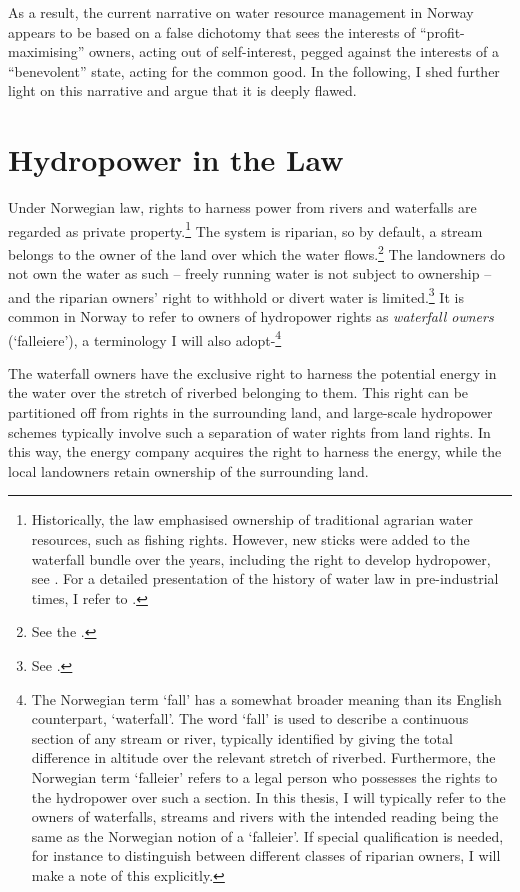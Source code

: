 As a result, the current narrative on water resource management in Norway appears to be based on a false dichotomy that sees the interests of ``profit-maximising'' owners, acting out of self-interest, pegged against the interests of a ``benevolent'' state, acting for the common good. In the following, I shed further light on this narrative and argue that it is deeply flawed.

\section{Hydropower in the Law}\label{sec:hl}

Under Norwegian law, rights to harness power from rivers and waterfalls are regarded as private property.\footnote{Historically, the law emphasised ownership of traditional agrarian water resources, such as fishing rights. However, new sticks were added to the waterfall bundle over the years, including the right to develop hydropower, see \cite[14-32]{vislie44}. For a detailed presentation of the history of water law in pre-industrial times, I refer to \cite{motzfeld08}.} The system is riparian, so by default, a stream belongs to the owner of the land over which the water flows.\footnote{See the \cite[13]{wra00}.} The landowners do not own the water as such -- freely running water is not subject to ownership -- and the riparian owners' right to withhold or divert water is limited.\footnote{See \cite[8|15]{wra00}.} It is common in Norway to refer to owners of hydropower rights as {\it waterfall owners} (`falleiere'), a terminology I will also adopt-\footnote{The Norwegian term `fall' has a somewhat broader meaning than its English counterpart, `waterfall'. The word `fall' is used to describe a continuous section of any stream or river, typically identified by giving the total difference in altitude over the relevant stretch of riverbed. Furthermore, the Norwegian term `falleier' refers to a legal person who possesses the rights to the hydropower over such a section. In this thesis, I will typically refer to the owners of waterfalls, streams and rivers with the intended reading being the same as the Norwegian notion of a `falleier'. If special qualification is needed, for instance to distinguish between different classes of riparian owners, I will make a note of this explicitly.}

The waterfall owners have the exclusive right to harness the potential energy in the water over the stretch of riverbed belonging to them. This right can be partitioned off from rights in the surrounding land, and large-scale hydropower schemes typically involve such a separation of water rights from land rights. In this way, the energy company acquires the right to harness the energy, while the local landowners retain ownership of the surrounding land.

